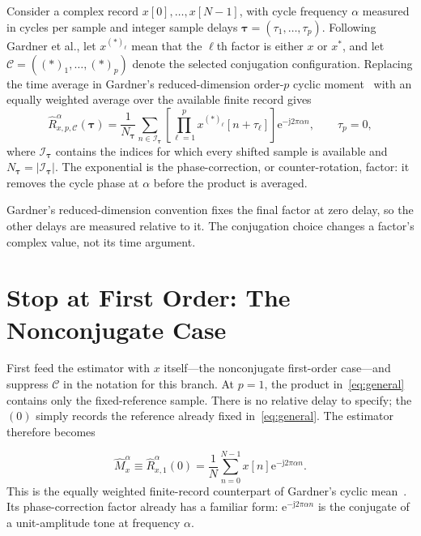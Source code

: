 \documentclass[11pt,draftcls,onecolumn,journal]{IEEEtran}
\newcommand{\vect}[1]{\bm{#1}}
\newcommand{\ee}{\mathrm{e}}
\newcommand{\jj}{\mathrm{j}}
\begin{document}
Consider a complex record $x[0],\ldots,x[N-1]$, with cycle frequency $\alpha$ measured in cycles per sample and integer sample delays $\vect{\tau}=(\tau_1,\ldots,\tau_p)$.  Following Gardner et al., let $x^{(*)_\ell}$ mean that the $\ell$th factor is either $x$ or $x^*$, and let $\mathcal{C}=((*)_1,\ldots,(*)_p)$ denote the selected conjugation configuration.  Replacing the time average in Gardner's reduced-dimension order-$p$ cyclic moment~\cite[eqs. (13.21) and (13.25)]{gardner2006} with an equally weighted average over the available finite record gives
\begin{equation}
\widehat R_{x,p,\mathcal{C}}^{\alpha}(\vect{\tau})
=\frac{1}{N_{\vect{\tau}}}
\sum_{n\in\mathcal I_{\vect{\tau}}}
\left[
\prod_{\ell=1}^{p}x^{(*)_\ell}[n+\tau_\ell]
\right]\ee^{-\jj2\pi\alpha n},
\qquad \tau_p=0,
\label{eq:general}
\end{equation}
where $\mathcal I_{\vect{\tau}}$ contains the indices for which every shifted sample is available and $N_{\vect{\tau}}=|\mathcal I_{\vect{\tau}}|$.  The exponential is the phase-correction, or counter-rotation, factor: it removes the cycle phase at $\alpha$ before the product is averaged.

Gardner's reduced-dimension convention fixes the final factor at zero delay, so the other delays are measured relative to it.  The conjugation choice changes a factor's complex value, not its time argument.

\section*{Stop at First Order: The Nonconjugate Case}

First feed the estimator with $x$ itself---the nonconjugate first-order case---and suppress $\mathcal C$ in the notation for this branch.  At $p=1$, the product in~\eqref{eq:general} contains only the fixed-reference sample.  There is no relative delay to specify; the $(0)$ simply records the reference already fixed in~\eqref{eq:general}.  The estimator therefore becomes

\begin{equation}
\widehat M_x^{\alpha}
\equiv\widehat R_{x,1}^{\alpha}(0)
=\frac{1}{N}\sum_{n=0}^{N-1}
x[n]\ee^{-\jj2\pi\alpha n}.
\label{eq:cyclicmean}
\end{equation}
This is the equally weighted finite-record counterpart of Gardner's cyclic mean~\cite[eq. (2)]{gardner1986}.  Its phase-correction factor already has a familiar form: $\ee^{-\jj2\pi\alpha n}$ is the conjugate of a unit-amplitude tone at frequency $\alpha$.
\end{document}
